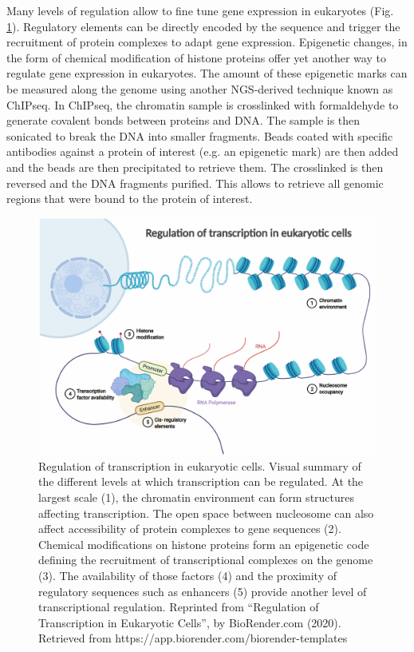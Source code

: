Many levels of regulation allow to fine tune gene expression in eukaryotes (Fig. \ref{fig:01-02:transcriptional-regulation}). Regulatory elements can be directly encoded by the sequence and trigger the recruitment of protein complexes to adapt gene expression. Epigenetic changes, in the form of chemical modification of histone proteins offer yet another way to regulate gene expression in eukaryotes. The amount of these epigenetic marks can be measured along the genome using another NGS-derived technique known as \acrfull{ChIPseq}. In \acrshort{ChIPseq}, the chromatin sample is crosslinked with formaldehyde to generate covalent bonds between proteins and DNA. The sample is then sonicated to break the DNA into smaller fragments. Beads coated with specific antibodies against a protein of interest (e.g. an epigenetic mark) are then added and the beads are then precipitated to retrieve them. The crosslinked is then reversed and the DNA fragments purified. This allows to retrieve all genomic regions that were bound to the protein of interest. 

\begin{figure}
    \includegraphics[width=\textwidth]{Parts/Part01/gfx/transcriptional_regulation_levels.pdf}
    \caption[Regulation of transcription in eukaryotic cells.]{Regulation of transcription in eukaryotic cells. Visual summary of the different levels at which transcription can be regulated. At the largest scale (1), the chromatin environment can form structures affecting transcription. The open space between nucleosome can also affect accessibility of protein complexes to gene sequences (2). Chemical modifications on histone proteins form an epigenetic code defining the recruitment of transcriptional complexes on the genome (3). The availability of those factors (4) and the proximity of regulatory sequences such as enhancers (5) provide another level of transcriptional regulation. Reprinted from “Regulation of Transcription in Eukaryotic Cells”, by BioRender.com (2020). Retrieved from https://app.biorender.com/biorender-templates }
    \label{fig:01-02:transcriptional-regulation}
\end{figure}


